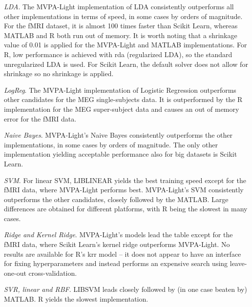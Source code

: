 \documentclass[utf8]{frontiersSCNS} %
\begin{document}
\textit{LDA}. The MVPA-Light implementation of LDA consistently outperforms all other implementations in terms of speed, in some cases by orders of magnitude. For the fMRI dataset, it is almost 100 times faster than Scikit Learn, whereas MATLAB and R both run out of memory. It is worth noting that a shrinkage value of 0.01 is applied for the MVPA-Light and MATLAB implementations. For R, low performance is achieved with rda (regularized LDA), so the standard unregularized LDA is used. For Scikit Learn, the default solver does not allow for shrinkage so no shrinkage is applied. 

\textit{LogReg}. The MVPA-Light implementation of Logistic Regression outperforms other candidates for the MEG single-subjects data. It is outperformed by the R implementation for the MEG super-subject data and causes an out of memory error for the fMRI data.

\textit{Naive Bayes}. MVPA-Light's Naive Bayes consistently outperforms the other implementations, in some cases by orders of magnitude. The only other implementation yielding acceptable performance also for big datasets is Scikit Learn.

\textit{SVM}. For linear SVM, LIBLINEAR yields the best training speed except for the fMRI data, where MVPA-Light performs best. MVPA-Light's SVM consistently outperforms the other candidates, closely followed by the MATLAB. Large differences are obtained for different platforms, with R being the slowest in many cases.

\textit{Ridge and Kernel Ridge}. MVPA-Light's models lead the table except for the fMRI data, where Scikit Learn's kernel ridge outperforms MVPA-Light. No results are available for R's krr model -- it does not appear to have an interface for fixing hyperparameters and instead performs an expensive search using leave-one-out cross-validation.

\textit{SVR, linear and RBF}. LIBSVM leads closely followed by (in one case beaten by) MATLAB. R yields the slowest implementation. 
\end{document}

